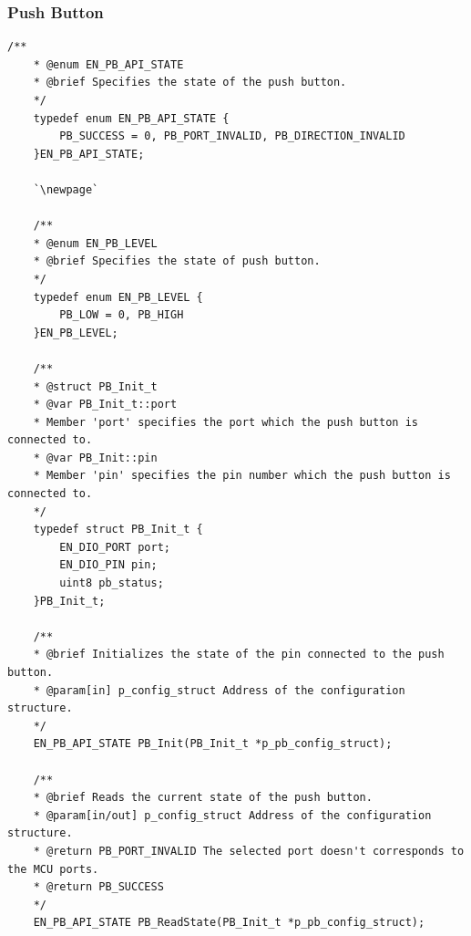 \documentclass[10pt]{article}
\begin{document}
\subsubsection{Push Button}
\begin{lstlisting}[style=CStyle,escapeinside=``]
	/**
	* @enum EN_PB_API_STATE
	* @brief Specifies the state of the push button.
	*/
	typedef enum EN_PB_API_STATE {
		PB_SUCCESS = 0, PB_PORT_INVALID, PB_DIRECTION_INVALID
	}EN_PB_API_STATE;
	
	`\newpage`
	
	/**
	* @enum EN_PB_LEVEL
	* @brief Specifies the state of push button.
	*/
	typedef enum EN_PB_LEVEL {
		PB_LOW = 0, PB_HIGH
	}EN_PB_LEVEL;
	
	/**
	* @struct PB_Init_t
	* @var PB_Init_t::port
	* Member 'port' specifies the port which the push button is connected to.
	* @var PB_Init::pin
	* Member 'pin' specifies the pin number which the push button is connected to.
	*/
	typedef struct PB_Init_t {
		EN_DIO_PORT port;
		EN_DIO_PIN pin;
		uint8 pb_status;
	}PB_Init_t;
	
	/**
	* @brief Initializes the state of the pin connected to the push button.
	* @param[in] p_config_struct Address of the configuration structure.
	*/
	EN_PB_API_STATE PB_Init(PB_Init_t *p_pb_config_struct);
	
	/**
	* @brief Reads the current state of the push button.
	* @param[in/out] p_config_struct Address of the configuration structure.
	* @return PB_PORT_INVALID The selected port doesn't corresponds to the MCU ports.
	* @return PB_SUCCESS
	*/
	EN_PB_API_STATE PB_ReadState(PB_Init_t *p_pb_config_struct);
\end{lstlisting}
\end{document}
